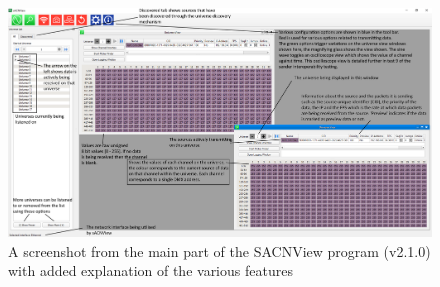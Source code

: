 \documentclass[11pt,a4paper]{article}
\begin{document}
\begin{figure}
	\label{SACN_VIEW_EXPLAINED}
	\includegraphics[width=\textwidth]{sacnViewExplained}
	\caption{A screenshot from the main part of the SACNView program (v2.1.0) with added explanation of the various features}
\end{figure}
\end{document}

